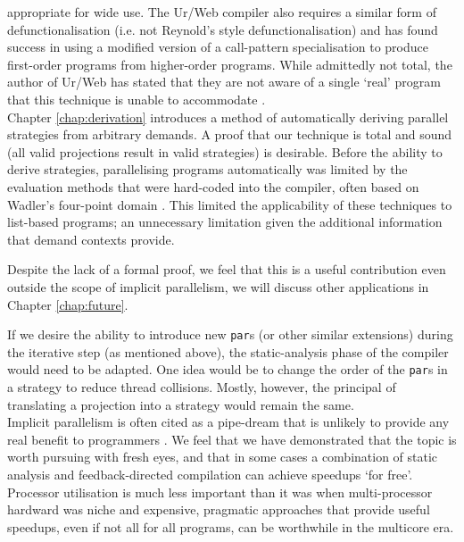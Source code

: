 appropriate for wide use. The Ur/Web compiler also requires a similar form of
defunctionalisation (i.e. not Reynold's style defunctionalisation)
\citep{ur-web} and has found success in using a modified version of a
call-pattern specialisation \citep{call-pattern-spec} to produce first-order
programs from higher-order programs. While admittedly not total, the author of
Ur/Web has stated that they are not aware of a single `real' program that this
technique is unable to accommodate \citep{chlipala}.
\\[0.35cm]
Chapter \ref{chap:derivation} introduces a method of automatically deriving
parallel strategies from arbitrary demands. A proof that our technique is total
and sound (all valid projections result in valid strategies) is desirable.
Before the ability to derive strategies, parallelising programs automatically
was limited by the evaluation methods that were hard-coded into the compiler,
often based on Wadler's four-point domain \citep{hogen1992automatic,
burn1987evaluation}.  This limited the applicability of these techniques to
list-based programs; an unnecessary limitation given the additional information
that demand contexts provide.

Despite the lack of a formal proof, we feel that this is a useful contribution
even outside the scope of implicit parallelism, we will discuss other
applications in Chapter \ref{chap:future}.

If we desire the ability to introduce new \verb|par|s (or other similar
extensions) during the iterative step (as mentioned above), the static-analysis
phase of the compiler would need to be adapted. One idea would be to change the
order of the \verb|par|s in a strategy to reduce thread collisions. Mostly,
however, the principal of translating a projection into a strategy would remain
the same.
\\[0.35cm]
Implicit parallelism is often cited as a pipe-dream that is unlikely to provide
any real benefit to programmers \citep{spjQuote1999, marlowBook, benEmail,
hammond2000research}.  We feel that we have demonstrated that the topic is
worth pursuing with fresh eyes, and that in some cases a combination of static
analysis and feedback-directed compilation can achieve speedups `for free'.
Processor utilisation is much less important than it was when multi-processor
hardward was niche and expensive, pragmatic approaches that provide useful
speedups, even if not all for all programs, can be worthwhile in the multicore
era.
